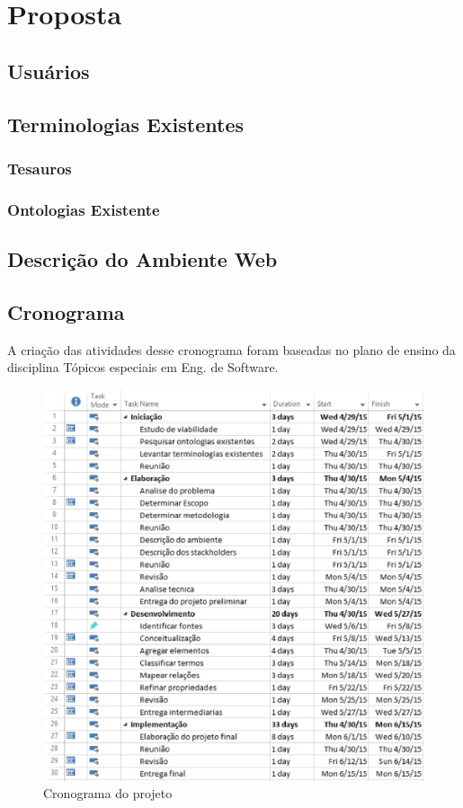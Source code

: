 \chapter{Proposta}\label{cap4}

\section{Usuários}


\section{Terminologias Existentes}

\subsection{Tesauros}

\subsection{Ontologias Existente}


\section{Descrição do Ambiente Web}




\section{Cronograma}
A criação das atividades desse cronograma foram baseadas no plano de ensino da disciplina Tópicos especiais em Eng. de Software. 

 \begin{figure}[ht]
  \centering
    \includegraphics[keepaspectratio=true,scale=0.5]{figuras/cronograma.eps}
  \caption{Cronograma do projeto}
\end{figure}